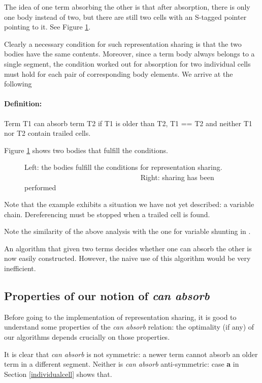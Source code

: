 \documentclass{tlp}
\begin{document}
The idea of one term absorbing the other is that after absorption,
there is only one body instead of two, but there are still two cells
with an S-tagged pointer pointing to it. See Figure \ref{fig6}.

Clearly a necessary condition for such representation sharing is that
the two bodies have the same contents. Moreover, since a term body
always belongs to a single segment, the condition worked out for
absorption for two individual cells must hold for each pair of
corresponding body elements. We arrive at the following

\paragraph{Definition:} Term T1 can absorb term T2 if T1 is older than
T2, T1 == T2 and neither T1 nor T2 contain trailed cells.


Figure \ref{fig6} shows two bodies that fulfill the conditions.
\begin{figure}[h]
\begin{centering}
{}
\caption{Left: the bodies fulfill the conditions for representation sharing.
~~~~~~~~~~~~~~~~~~~~~~~~~~~~~~~~ Right: sharing has been performed}
\label{fig6}
\end{centering}
\end{figure}

Note that the example exhibits a situation we have not yet described:
a variable chain. Dereferencing must be stopped when a trailed cell is
found.

Note the similarity of the above analysis with the one for variable
shunting in \cite{VariableShunting}.

An algorithm that given two terms decides whether one can absorb the
other is now easily constructed. However, the naive use of this
algorithm would be very inefficient.

\subsection{ Properties of our notion of {\em can absorb}}
Before going to the implementation of representation sharing, it is
good to understand some properties of the {\em can absorb} relation:
the optimality (if any) of our algorithms depends crucially on those
properties.

It is clear that {\em can absorb} is not symmetric: a newer term
cannot absorb an older term in a different segment.
Neither is {\em can absorb} anti-symmetric: case {\bf a} in Section
\ref{individualcell} shows that.
\end{document}
